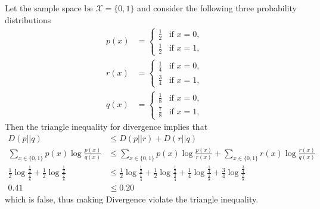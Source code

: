\documentclass[
  coursecode={MTHE 474},
  assignmentname={Homework \homeworknumber},
  studentnumber=20053722,
  name={Bryan Hoang},
]{
  ltxanswer%
}
\begin{document}
  \begin{questions}
    \setcounter{question}{\questionnumber}
    \addtocounter{question}{-1}
    \question[10]\
    \begin{parts}
      \part{}
      \begin{solution}
        \begin{example}
          Let the sample space be \(\mathcal{X}=\{0,1\}\) and consider the following three probability distributions
          \begin{align*}
            p(x) &= \begin{cases}
                      \frac{1}{2} &\text{if } x=0, \\
                      \frac{1}{2} &\text{if } x=1,
                    \end{cases} \\
            r(x) &= \begin{cases}
                      \frac{1}{4} &\text{if } x=0, \\
                      \frac{3}{4} &\text{if } x=1,
                    \end{cases} \\
            q(x) &= \begin{cases}
                      \frac{1}{8} &\text{if } x=0, \\
                      \frac{7}{8} &\text{if } x=1,
                    \end{cases}
          \end{align*}
          Then the triangle inequality for divergence implies that
          \begin{align*}
            D(p||q)                                                                                           &\le D(p||r) + D(r||q)                                                                                                                                                                                     \\
            \sum_{x\in\{0,1\}} p(x)\log\frac{p(x)}{q(x)}                                                      &\le \sum_{x\in\{0,1\}} p(x)\log\frac{p(x)}{r(x)} + \sum_{x\in\{0,1\}} r(x)\log\frac{r(x)}{q(x)}                                                                                                           \\
            \frac{1}{2} \log\frac{\frac{1}{2}}{\frac{1}{8}} + \frac{1}{2} \log\frac{\frac{1}{2}}{\frac{7}{8}} &\le \frac{1}{2} \log\frac{\frac{1}{2}}{\frac{1}{4}} + \frac{1}{2} \log\frac{\frac{1}{2}}{\frac{3}{4}} + \frac{1}{4} \log\frac{\frac{1}{4}}{\frac{1}{8}} + \frac{3}{4} \log\frac{\frac{3}{4}}{\frac{7}{8}} \\
            0.41                                                                                              &\le 0.20
          \end{align*}
          which is false, thus making Divergence violate the triangle inequality.
        \end{example}
      \end{solution}


\end{parts}
\end{questions}
\end{document}
